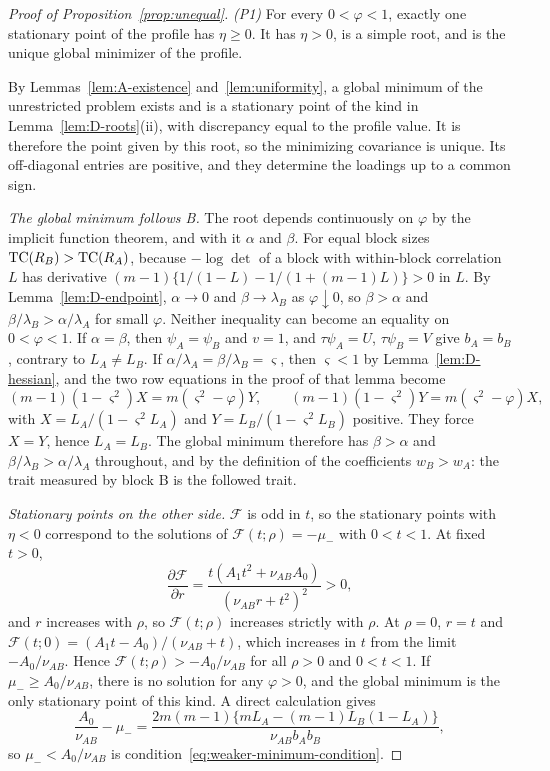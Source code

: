 \begin{proof}[Proof of Proposition~\ref{prop:unequal}]
\textit{(P1)} For every $0<\varphi<1$, exactly one stationary point of the profile has $\eta\ge0$. It has $\eta>0$, is a simple root, and is the unique global minimizer of the profile.

By Lemmas~\ref{lem:A-existence} and~\ref{lem:uniformity}, a global minimum of the unrestricted problem exists and is a stationary point of the kind in Lemma~\ref{lem:D-roots}(ii), with discrepancy equal to the profile value. It is therefore the point given by this root, so the minimizing covariance is unique. Its off-diagonal entries are positive, and they determine the loadings up to a common sign.

\textit{The global minimum follows B.} The root depends continuously on $\varphi$ by the implicit function theorem, and with it $\alpha$ and $\beta$. For equal block sizes $\operatorname{TC}(R_B)>\operatorname{TC}(R_A)$, because $-\log\det$ of a block with within-block correlation $L$ has derivative $(m-1)\{1/(1-L)-1/(1+(m-1)L)\}>0$ in $L$. By Lemma~\ref{lem:D-endpoint}, $\alpha\to0$ and $\beta\to\lambda_B$ as $\varphi\downarrow0$, so $\beta>\alpha$ and $\beta/\lambda_B>\alpha/\lambda_A$ for small $\varphi$. Neither inequality can become an equality on $0<\varphi<1$. If $\alpha=\beta$, then $\psi_A=\psi_B$ and $v=1$, and $\tau\psi_A=U$, $\tau\psi_B=V$ give $b_A=b_B$, contrary to $L_A\ne L_B$. If $\alpha/\lambda_A=\beta/\lambda_B=\varsigma$, then $\varsigma<1$ by Lemma~\ref{lem:D-hessian}, and the two row equations in the proof of that lemma become
\[
(m-1)(1-\varsigma^2)X=m(\varsigma^2-\varphi)Y,\qquad
(m-1)(1-\varsigma^2)Y=m(\varsigma^2-\varphi)X,
\]
with $X=L_A/(1-\varsigma^2L_A)$ and $Y=L_B/(1-\varsigma^2L_B)$ positive. They force $X=Y$, hence $L_A=L_B$. The global minimum therefore has $\beta>\alpha$ and $\beta/\lambda_B>\alpha/\lambda_A$ throughout, and by the definition of the coefficients $w_B>w_A$: the trait measured by block B is the followed trait.

\textit{Stationary points on the other side.} $\mathcal F$ is odd in $t$, so the stationary points with $\eta<0$ correspond to the solutions of $\mathcal F(t;\rho)=-\mu_-$ with $0<t<1$. At fixed $t>0$,
\[
\frac{\partial\mathcal F}{\partial r}=\frac{t(A_1t^2+\nu_{AB}A_0)}{(\nu_{AB}r+t^2)^2}>0,
\]
and $r$ increases with $\rho$, so $\mathcal F(t;\rho)$ increases strictly with $\rho$. At $\rho=0$, $r=t$ and $\mathcal F(t;0)=(A_1t-A_0)/(\nu_{AB}+t)$, which increases in $t$ from the limit $-A_0/\nu_{AB}$. Hence $\mathcal F(t;\rho)>-A_0/\nu_{AB}$ for all $\rho>0$ and $0<t<1$. If $\mu_-\ge A_0/\nu_{AB}$, there is no solution for any $\varphi>0$, and the global minimum is the only stationary point of this kind. A direct calculation gives
\[
\frac{A_0}{\nu_{AB}}-\mu_-=\frac{2m(m-1)\{mL_A-(m-1)L_B(1-L_A)\}}{\nu_{AB}b_Ab_B},
\]
so $\mu_-<A_0/\nu_{AB}$ is condition~\eqref{eq:weaker-minimum-condition}.


\end{proof}

